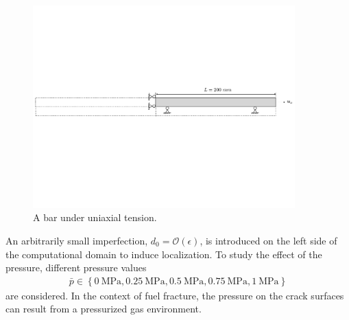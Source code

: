 \begin{figure}[!ht]
  \centering
  \includegraphics[width=0.9\textwidth,trim={0 8cm 0 8cm},clip]{Chapter3/figures/bar}
  \caption{A bar under uniaxial tension.}
  \label{fig:bar}
\end{figure}

An arbitrarily small imperfection, $d_0 = \mathcal{O}(\epsilon)$, is introduced on the left side of the computational domain to induce localization.
To study the effect of the pressure, different pressure values
\begin{align*}
  \bar{p} \in \left\{ \SI{0}{\mega\pascal}, \SI{0.25}{\mega\pascal}, \SI{0.5}{\mega\pascal}, \SI{0.75}{\mega\pascal}, \SI{1}{\mega\pascal} \right\}
\end{align*}
are considered. In the context of fuel fracture, the pressure on the crack surfaces can result from a pressurized gas environment.



